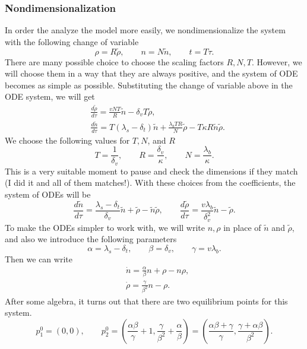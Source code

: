 \subsubsection*{Nondimensionalization}
In order the analyze the model more easily, we nondimensionalize the system with the following change of variable
\[ \rho = R \tilde{\rho}, \qquad n = N \tilde{n}, \qquad t = T \tau. \]
There are many possible choice to choose the scaling factors $R, N, T$. However, we will choose them in a way that they are always positive, and the system of ODE becomes as simple as possible. Substituting the change of variable above in the ODE system, we will get
\begin{align*}
	&\frac{d\tilde{\rho}}{d\tau} = \frac{vNT}{R}\tilde{n} - \delta_v T \tilde{\rho},\\
	&\frac{d\tilde{n}}{d\tau} = T(\lambda_s-\delta_t)\tilde{n} + \frac{\lambda_b T R}{N} \tilde{\rho} - T\kappa R \tilde{n}\tilde{\rho}. \tag{\twonotes}
\end{align*}
We choose the following values for $T,N$, and $R$
\[ T = \frac{1}{\delta_v}, \qquad R = \frac{\delta_v}{\kappa}, \qquad N = \frac{\lambda_b}{\kappa}. \]
This is a very suitable moment to pause and check the dimensions if they match (I did it and all of them matches!). With these choices from the coefficients, the system of ODEs will be
\[ \frac{d\tilde{n}}{d \tau} = \frac{\lambda_s - \delta_t}{\delta_v} \tilde{n} + \tilde{\rho} - \tilde{n}\tilde{\rho}, \qquad
\frac{d\tilde{\rho}}{d\tau} = \frac{v\lambda_b}{\delta_v^2}\tilde{n} - \tilde{\rho}. \]
To make the ODEs simpler to work with, we will write $n,\rho$ in place of $\tilde{n}$ and $\tilde{\rho}$, and also we introduce the following parameters
\[ \alpha = \lambda_s - \delta_t, \qquad \beta =\delta_v, \qquad \gamma = v\lambda_b. \tag{$\clubsuit$} \]
Then we can write
\begin{equation*}
	\boxed{
		\begin{aligned}
			&\dot{n} = \frac{\alpha}{\beta}n + \rho - n\rho, \\
			&\dot{\rho} = \frac{\gamma}{\beta^2}n -\rho.
		\end{aligned}
	}
	\tag{\smiley}
\end{equation*}
After some algebra, it turns out that there are two equilibrium points for this system.
\[ p^0_1 = (0,0), \qquad p^0_2 = (\frac{\alpha\beta}{\gamma} + 1, \frac{\gamma}{\beta^2}+\frac{\alpha}{\beta}) = (\frac{\alpha\beta+\gamma}{\gamma},\frac{\gamma + \alpha\beta}{\beta^2}). \]
